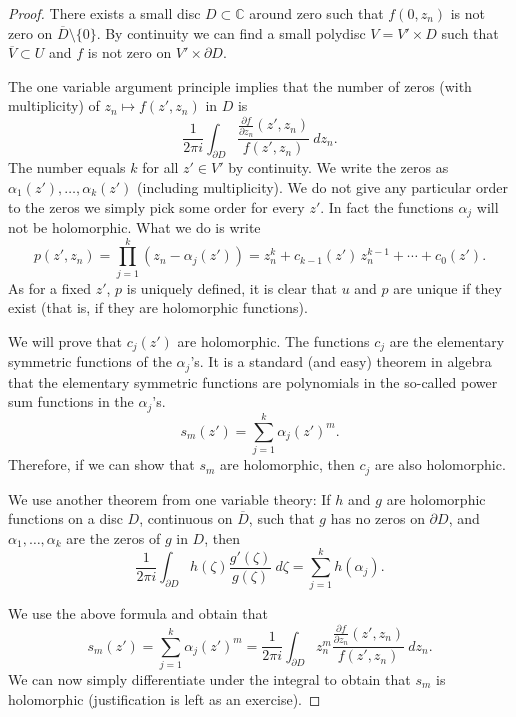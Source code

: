 \documentclass[12pt,openany]{book}
\newcommand{\C}{{\mathbb{C}}}
\theoremstyle{plain}
\theoremstyle{remark}
\theoremstyle{definition}
\theoremstyle{exercise}
\theoremstyle{example}
\begin{document}
\begin{proof}
There exists a small disc $D \subset \C$ around zero such that
$f(0,z_n)$ is not zero on $\overline{D} \setminus \{ 0 \}$.  By continuity
we can find a small polydisc $V = V' \times D$ such that
$\overline{V} \subset U$ and $f$ is not zero on
$V' \times \partial D$.

The one variable argument principle implies that the number of zeros (with
multiplicity) of $z_n
\mapsto f(z',z_n)$ in $D$ is
\begin{equation}
\frac{1}{2\pi i}
\int_{\partial D}
\frac{\frac{\partial f}{\partial z_n} (z',z_n)}{f(z',z_n)} ~dz_n .
\end{equation}
The number equals $k$ for all $z' \in V'$ by continuity.  We
write the zeros as $\alpha_1(z'),\ldots,\alpha_k(z')$ (including
multiplicity).  We do not give any particular order to the zeros
we simply pick some order for every $z'$.
In fact the functions $\alpha_j$ will not be holomorphic.  What we do is
write
\begin{equation}
p(z',z_n)
=
\prod_{j=1}^k (z_n-\alpha_j(z'))
=
z_n^k + c_{k-1}(z') \, z_n^{k-1} + \cdots + c_0 (z') .
\end{equation}
As for a fixed $z'$, $p$ is uniquely defined, it is
clear that
$u$ and $p$ are unique if they exist (that is, if they are holomorphic
functions).

We will prove that $c_j(z')$ are holomorphic.  The functions $c_j$ are
the elementary symmetric functions of the $\alpha_j$'s.  It is a standard (and
easy) theorem in algebra that the elementary symmetric functions are
polynomials in the so-called power sum functions in the $\alpha_j$'s.
\begin{equation}
s_m(z') = \sum_{j=1}^k \alpha_j(z')^m .
\end{equation}
Therefore, if we can show that $s_m$ are holomorphic, then $c_j$ are also
holomorphic.

We use another theorem from one variable theory: If $h$ and $g$ are
holomorphic functions on a disc $D$, continuous on $\overline{D}$,
such that $g$ has no zeros on $\partial D$, and $\alpha_1,\ldots,\alpha_k$
are the zeros of $g$ in $D$, then
\begin{equation}
\frac{1}{2 \pi i}
\int_{\partial D} h(\zeta) \frac{g'(\zeta)}{g(\zeta)} ~d\zeta
= \sum_{j=1}^k h(\alpha_j) .
\end{equation}

We use the above formula and obtain that
\begin{equation}
s_m(z') = 
\sum_{j=1}^k \alpha_j(z')^m
=
\frac{1}{2\pi i}
\int_{\partial D}
z_n^m
\frac{\frac{\partial f}{\partial z_n} (z',z_n)}{f(z',z_n)} ~dz_n .
\end{equation}
We can now simply differentiate under the integral to obtain that $s_m$
is holomorphic (justification is left as an exercise).
\end{proof}
\end{document}
